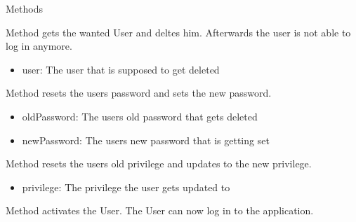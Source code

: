 \begin{methodenv}{Methods}


Method gets the wanted User and deltes him. Afterwards the user is not able to log in anymore.

\begin{itemize}
	\item{user:}
	The user that is supposed to get deleted
\end{itemize}



Method resets the users password and sets the new password.

\begin{itemize}
	\item{oldPassword:}
	The users old password that gets deleted
	\item{newPassword:}
	The users new password that is getting set
\end{itemize}


Method resets the users old privilege and updates to the new privilege.

\begin{itemize}
	\item{privilege:}
	The privilege the user gets updated to
\end{itemize}


Method activates the User. The User can now log in to the application.

\end{methodenv}










